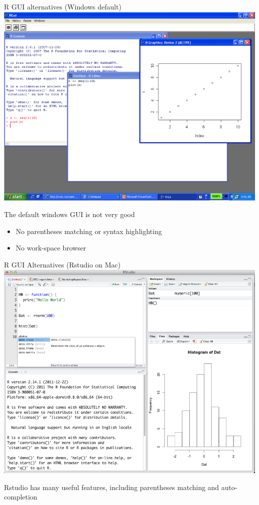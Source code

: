 \documentclass[table,smaller]{beamer}
\begin{document}
\begin{frame}[label=sec-2-2]{R GUI alternatives (Windows default)}
\includegraphics[width=.75\textwidth]{images/Rgui.png}

The default windows GUI is not very good
\begin{itemize}
\item No parentheses matching or syntax highlighting
\item No work-space browser
\end{itemize}
\end{frame}

\begin{frame}[label=sec-2-3]{R GUI Alternatives (Rstudio on Mac)}
\includegraphics[width=.75\textwidth]{images/Rstudio.png}

Rstudio has many useful features, including parentheses matching and auto-completion
\end{frame}
\end{document}
